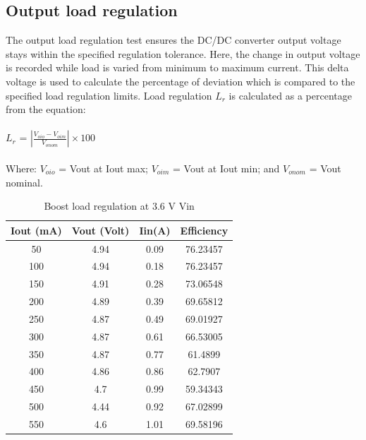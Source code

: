\subsection{Output load regulation} 
The output load regulation test ensures the DC/DC converter output voltage stays within the specified regulation tolerance. Here, the change in output voltage is recorded while load is varied from minimum to maximum current. This delta voltage is used to calculate the percentage of deviation which is compared to the specified load regulation limits. Load regulation $L_{r}$ is calculated as a percentage from the equation:
\\ \\
\hspace*{5cm}$L_{r}$ = $\left | \frac{V_{oio}-V_{oim}}{V_{onom}} \right | \times 100$
\\ \\
Where:
$V_{oio}$ = Vout at Iout max; 
$V_{oim}$ = Vout at Iout min; and
$V_{onom}$ = Vout nominal.
\pagebreak
\begin{table}[H]
\centering
\begin{tabular}{c c c c}
\toprule
Iout (mA) & Vout (Volt) & Iin(A) & Efficiency \\ \midrule\midrule
50        & 4.94        & 0.09   & 76.23457   \\ 
100       & 4.94        & 0.18   & 76.23457   \\ 
150       & 4.91        & 0.28   & 73.06548   \\ 
200       & 4.89        & 0.39   & 69.65812   \\ 
250       & 4.87        & 0.49   & 69.01927   \\ 
300       & 4.87        & 0.61   & 66.53005   \\ 
350       & 4.87        & 0.77   & 61.4899    \\ 
400       & 4.86        & 0.86   & 62.7907    \\ 
450       & 4.7         & 0.99   & 59.34343   \\ 
500       & 4.44        & 0.92   & 67.02899   \\ 
550       & 4.6         & 1.01   & 69.58196   \\ 
\bottomrule
\end{tabular}
\caption{Boost load regulation at 3.6 V Vin}
\label{table:4}
\end{table}
\\
